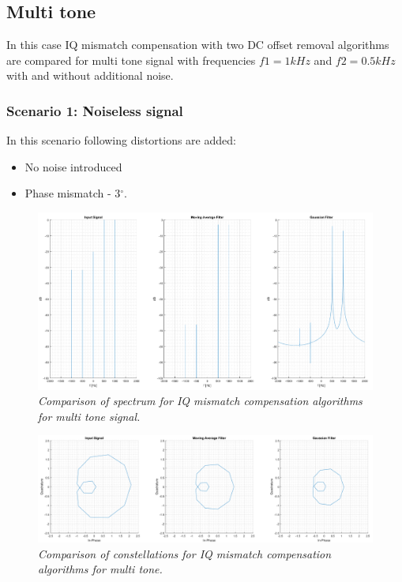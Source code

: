 \documentclass[en,printmode]{mgr}
\begin{document}
   	\subsection*{Multi tone}
   		In this case IQ mismatch compensation with two DC offset removal algorithms are compared for
		multi tone signal with frequencies $f1=1kHz$ and $f2=0.5kHz$ with and without additional noise.
		\subsubsection*{Scenario 1: Noiseless signal}
			In this scenario following distortions are added:
			\begin{itemize}
				\item No noise introduced
				\item Phase mismatch - 3$^\circ$.
			\end{itemize}
			\begin{figure}[!htb]
    			\centering
   				\includegraphics[width=\textwidth]{plots/multi_f.png}
   		 		\caption{\textit{Comparison of spectrum for IQ mismatch compensation algorithms 
   		 		for multi tone signal.}}
   		 	\end{figure}	
   		 	\begin{figure}[!htb]
    			\centering
   				\includegraphics[width=\textwidth]{plots/multi_c.png}
   		 		\caption{\textit{Comparison of constellations for IQ mismatch compensation algorithms
   		 		for multi tone.}}
   		 	\end{figure}
   		 	
\end{document}

